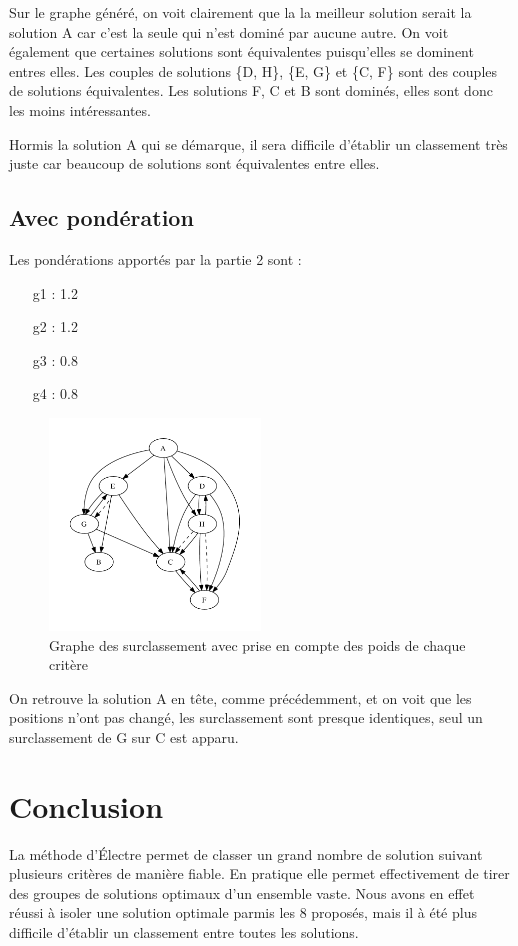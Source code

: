 Sur le graphe généré, on voit clairement que la la meilleur solution serait la
solution A car c'est la seule qui n'est dominé par aucune autre.
On voit également que certaines solutions sont équivalentes puisqu'elles se
dominent entres elles. Les couples de solutions \{D, H\}, \{E, G\} et \{C, F\}
sont des couples de solutions équivalentes.
Les solutions F, C et B sont dominés, elles sont donc les moins intéressantes.

Hormis la solution A qui se démarque, il sera difficile d'établir un classement très juste car beaucoup de solutions sont équivalentes entre elles.

\subsection{Avec pondération}

Les pondérations apportés par la partie 2 sont :
\begin{itemize}
\item[g1] : 1.2
\item[g2] : 1.2
\item[g3] : 0.8
\item[g4] : 0.8
\end{itemize}

\clearpage
	
\begin{figure}[!h]
\begin{center}
\includegraphics[width=0.5\textwidth]{../SourcesMatlab/electre3-2.pdf}
\caption{Graphe des surclassement avec prise en compte des poids de chaque critère}
\end{center}
\end{figure}

On retrouve la solution A en tête, comme précédemment, et on voit que les positions n'ont pas changé, les surclassement sont presque identiques, seul un surclassement de G sur C est apparu.

\section{Conclusion}

La méthode d'Électre  permet de classer un grand nombre de solution suivant plusieurs critères de manière fiable. En pratique elle permet effectivement de tirer des groupes de solutions optimaux d'un ensemble vaste.
Nous avons en effet réussi à isoler une solution optimale parmis les 8 proposés, mais il à été plus difficile d'établir un classement entre toutes les solutions.